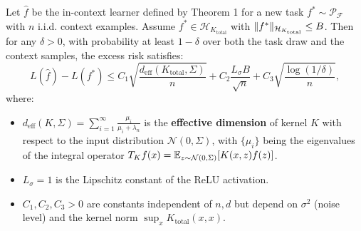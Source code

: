 	\begin{theorem}
		\label{thm:gen_bound}
		Let \(\hat{f}\) be the in-context learner defined by Theorem 1 for a new task \(f^* \sim \mathcal{P}_{\mathcal{F}}\) with \(n\) i.i.d. context examples. Assume \(f^* \in \mathcal{H}_{K_{\text{total}}}\) with \(\lVert f^* \rVert_{\mathcal{H}_{K_{\text{total}}}} \leq B\). Then for any \(\delta > 0\), with probability at least \(1 - \delta\) over both the task draw and the context samples, the excess risk satisfies:
		\begin{equation}
			L(\hat{f}) - L(f^*) \leq C_1 \sqrt{\frac{d_{\text{eff}}(K_{\text{total}}, \Sigma)}{n}} + C_2 \frac{L_\sigma B}{\sqrt{n}} + C_3 \sqrt{\frac{\log(1/\delta)}{n}},
			\label{eq:gen_bound}
		\end{equation}
		where:
		\begin{itemize}
			\item \(d_{\text{eff}}(K, \Sigma) = \sum_{i=1}^\infty \frac{\mu_i}{\mu_i + \lambda_n}\) is the \textbf{effective dimension} of kernel \(K\) with respect to the input distribution \(\mathcal{N}(0, \Sigma)\), with \(\{\mu_i\}\) being the eigenvalues of the integral operator \(T_K f(x) = \mathbb{E}_{z \sim \mathcal{N}(0, \Sigma)}[K(x, z) f(z)]\).
			\item \(L_\sigma = 1\) is the Lipschitz constant of the ReLU activation.
			\item \(C_1, C_2, C_3 > 0\) are constants independent of \(n, d\) but depend on \(\sigma^2\) (noise level) and the kernel norm \(\sup_{x} K_{\text{total}}(x, x)\).
		\end{itemize}
	\end{theorem}
	
